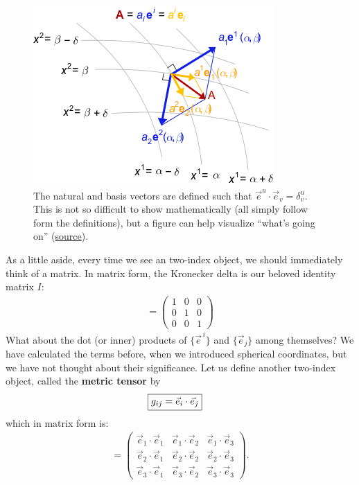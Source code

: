 \documentclass{book}
\theoremstyle{definition}
\begin{document}
\begin{figure}[h!]
	\centering
	\includegraphics[scale=0.55]{gr-fig-8.png}
	\caption{The natural and basis vectors are defined such that $\vec{e}^{u}\cdot\vec{e}_v = \delta^u_v$. This is not so difficult to show mathematically (all simply follow form the definitions), but a figure can help visualize ``what's going on'' (\href{https://en.wikipedia.org/wiki/Covariance_and_contravariance_of_vectors}{source}).} 
\end{figure}
As a little aside, every time we see an two-index object, we should immediately think of a matrix. In matrix form, the Kronecker delta is our beloved identity matrix $I$:
\begin{align*}
[\delta^i_j] = 
\begin{pmatrix}
1 & 0 & 0\\
0 & 1 & 0\\
0 & 0 & 1
\end{pmatrix}
\end{align*}
What about the dot (or inner) products of $\{\vec{e}^{\,i}\}$ and $\{\vec{e}_j \}$ among themselves? We have calculated the terms before, when we introduced spherical coordinates, but we have not thought about their significance. Let us define another two-index object, called the \textbf{metric tensor} by
\begin{align*}
\Aboxed{g_{ij} = \vec{e}_i\cdot\vec{e}_j}
\end{align*}
which in matrix form is:
\begin{align*}
[g_{ij}] = 
\begin{pmatrix}
\vec{e}_1\cdot\vec{e}_1 & \vec{e}_1\cdot\vec{e}_2 & \vec{e}_1\cdot\vec{e}_3\\
\vec{e}_2\cdot\vec{e}_1 & \vec{e}_2\cdot\vec{e}_2 & \vec{e}_2\cdot\vec{e}_3\\
\vec{e}_3\cdot\vec{e}_1 & \vec{e}_3\cdot\vec{e}_2 & \vec{e}_3\cdot\vec{e}_3
\end{pmatrix}.
\end{align*}
\end{document}
